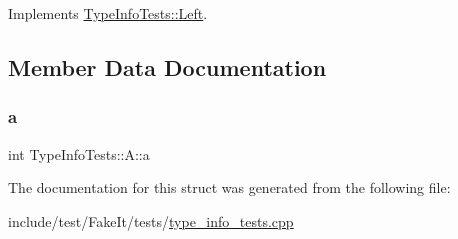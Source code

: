 Implements \mbox{\hyperlink{structTypeInfoTests_1_1Left_afb4d9ad3c054e9339eb5dd2b18d2f347}{Type\+Info\+Tests\+::\+Left}}.



\subsection{Member Data Documentation}
\mbox{\label{structTypeInfoTests_1_1A_a8e5e3ed198c72a79afaacbc51b7f417a}} 
\subsubsection{\texorpdfstring{a}{a}}
{\footnotesize\ttfamily int Type\+Info\+Tests\+::\+A\+::a}



The documentation for this struct was generated from the following file\+:\begin{DoxyCompactItemize}
\item 
include/test/\+Fake\+It/tests/\mbox{\hyperlink{type__info__tests_8cpp}{type\+\_\+info\+\_\+tests.\+cpp}}\end{DoxyCompactItemize}
